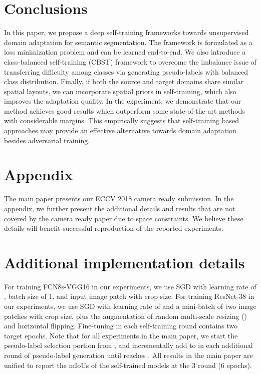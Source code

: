 \documentclass[runningheads]{llncs}
\begin{document}
\section{Conclusions}
In this paper, we propose a deep self-training frameworks towards unsupervised domain adaptation for semantic segmentation. The framework is formulated as a loss minimization problem and can be learned end-to-end. We also introduce a class-balanced self-training (CBST) framework to overcome the imbalance issue of transferring difficulty among classes via generating pseudo-labels with balanced class distribution. Finally, if both the source and target domains share similar spatial layouts, we can incorporate spatial priors in self-training, which also improves the adaptation quality. In the experiment, we demonstrate that our method achieves good results which outperform some state-of-the-art methods with considerable margins. This empirically suggests that self-training based approaches may provide an effective alternative towards domain adaptation besides adversarial training.

\clearpage





\section*{Appendix}
The main paper presents our ECCV 2018 camera ready submission. In the appendix, we further present the additional details and results that are not covered by the camera ready paper due to space constraints. We believe these details will benefit successful reproduction of the reported experiments.

\setcounter{section}{0}
\renewcommand{\thesection}{\Alph{section}}

\section{Additional implementation details}
For training FCN8s-VGG16 in our experiments, we use SGD with learning rate of , batch size of 1, and input image patch with  crop size. For training ResNet-38 in our experiments, we use SGD with learning rate of  and a mini-batch of two image patches with  crop size, plus the augmentation of random multi-scale resizing () and horizontal flipping. Fine-tuning in each self-training round contains two target epochs. Note that for all experiments in the main paper, we start the pseudo-label selection portion  from , and incrementally add  to  in each additional round of pseudo-label generation until  reaches . All results in the main paper are unified to report the mIoUs of the self-trained models at the 3 round (6 epochs). 
\end{document}
